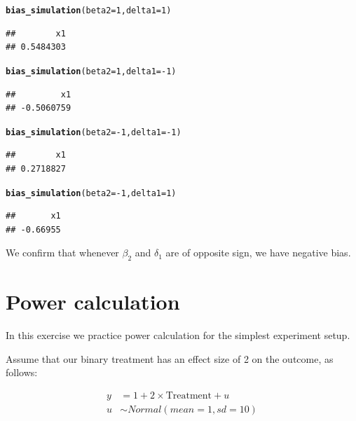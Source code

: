 \documentclass{article}\usepackage[]{graphicx}\usepackage[]{color}
\makeatletter
\newcommand{\hlnum}[1]{\textcolor[rgb]{0.686,0.059,0.569}{#1}}%
\newcommand{\hlopt}[1]{\textcolor[rgb]{0,0,0}{#1}}%
\newcommand{\hlstd}[1]{\textcolor[rgb]{0.345,0.345,0.345}{#1}}%
\newcommand{\hlkwc}[1]{\textcolor[rgb]{0.333,0.667,0.333}{#1}}%
\newcommand{\hlkwd}[1]{\textcolor[rgb]{0.737,0.353,0.396}{\textbf{#1}}}%
\newenvironment{kframe}{%
 \def\at@end@of@kframe{}%
 \ifinner\ifhmode%
  \def\at@end@of@kframe{\end{minipage}}%
  \begin{minipage}{\columnwidth}%
 \fi\fi%
 \def\FrameCommand##1{\hskip\@totalleftmargin \hskip-\fboxsep
 \colorbox{shadecolor}{##1}\hskip-\fboxsep
     \hskip-\linewidth \hskip-\@totalleftmargin \hskip\columnwidth}%
 \MakeFramed {\advance\hsize-\width
   \@totalleftmargin\z@ \linewidth\hsize
   \@setminipage}}%
 {\par\unskip\endMakeFramed%
 \at@end@of@kframe}
\newenvironment{knitrout}{}{} %
\makeatother
\begin{document}
\begin{knitrout}
\color{fgcolor}\begin{kframe}
\begin{alltt}
\hlkwd{bias_simulation}\hlstd{(}\hlkwc{beta2} \hlstd{=} \hlnum{1}\hlstd{,} \hlkwc{delta1} \hlstd{=} \hlnum{1}\hlstd{)}
\end{alltt}
\begin{verbatim}
##        x1 
## 0.5484303
\end{verbatim}
\begin{alltt}
\hlkwd{bias_simulation}\hlstd{(}\hlkwc{beta2} \hlstd{=} \hlnum{1}\hlstd{,} \hlkwc{delta1} \hlstd{=} \hlopt{-}\hlnum{1}\hlstd{)}
\end{alltt}
\begin{verbatim}
##         x1 
## -0.5060759
\end{verbatim}
\begin{alltt}
\hlkwd{bias_simulation}\hlstd{(}\hlkwc{beta2} \hlstd{=} \hlopt{-}\hlnum{1}\hlstd{,} \hlkwc{delta1} \hlstd{=} \hlopt{-}\hlnum{1}\hlstd{)}
\end{alltt}
\begin{verbatim}
##        x1 
## 0.2718827
\end{verbatim}
\begin{alltt}
\hlkwd{bias_simulation}\hlstd{(}\hlkwc{beta2} \hlstd{=} \hlopt{-}\hlnum{1}\hlstd{,} \hlkwc{delta1} \hlstd{=} \hlnum{1}\hlstd{)}
\end{alltt}
\begin{verbatim}
##       x1 
## -0.66955
\end{verbatim}
\end{kframe}
\end{knitrout}

We confirm that whenever $\beta_2$ and $\delta_1$ are of opposite sign, we have negative bias.

\section{Power calculation}

In this exercise we practice power calculation for the simplest experiment setup.

Assume that our binary treatment has an effect size of 2 on the outcome, as follows:

$$
\begin{aligned}
y &= 1 + 2 \times \text{Treatment} + u \\
u &\sim Normal(mean = 1, sd = 10) \\
\end{aligned}
$$
\end{document}

